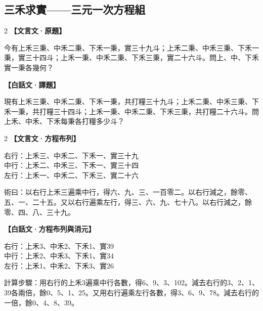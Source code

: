 \documentclass[11pt,a4paper]{article}
\newcommand{\zhc}{}[1]{{\CJKfamily{\CJKrmdefault}#1}}  %
\newcommand{\zhm}[1]{{\CJKfamily{\CJKrmdefault}#1}}  %
\newenvironment{prob bilingual}[1][]{%
  \begin{paracol}{2}%
  \setlength{\columnseprule}{0.4pt}%
}{%
  \end{paracol}%
  \medskip%
}
\begin{document}
\vspace{0.5cm}

\subsection{\zhc{三禾求實——三元一次方程組}}

\begin{paracol}{2}
\switchcolumn[0]
\noindent\textbf{\textcolor{notecolor}{\zhc{【文言文·原題】}}}\par\smallskip
\zhc{
今有上禾三秉、中禾二秉、下禾一秉，實三十九斗；上禾二秉、中禾三秉、下禾一秉，實三十四斗；上禾一秉、中禾二秉、下禾三秉，實二十六斗。問上、中、下禾實一秉各幾何？
}

\switchcolumn[1]
\noindent\textbf{\textcolor{notecolor}{\zhm{【白話文·譯題】}}}\par\smallskip
\zhm{
現有上禾三秉、中禾二秉、下禾一秉，共打糧三十九斗；上禾二秉、中禾三秉、下禾一秉，共打糧三十四斗；上禾一秉、中禾二秉、下禾三秉，共打糧二十六斗。問上禾、中禾、下禾每秉各打糧多少斗？
}
\end{paracol}

\medskip

\begin{paracol}{2}
\switchcolumn[0]
\noindent\textbf{\textcolor{notecolor}{\zhc{【文言文·方程布列】}}}\par\smallskip
\zhc{
右行：上禾三、中禾二、下禾一、實三十九\\
中行：上禾二、中禾三、下禾一、實三十四\\
左行：上禾一、中禾二、下禾三、實二十六

術曰：以右行上禾三遍乘中行，得六、九、三、一百零二。以右行減之，餘零、五、一、二十五。又以右行遍乘左行，得三、六、九、七十八。以右行減之，餘零、四、八、三十九。
}

\switchcolumn[1]
\noindent\textbf{\textcolor{notecolor}{\zhm{【白話文·方程布列與消元】}}}\par\smallskip
\zhm{
右行：上禾3、中禾2、下禾1、實39\\
中行：上禾2、中禾3、下禾1、實34\\
左行：上禾1、中禾2、下禾3、實26

計算步驟：用右行的上禾3遍乘中行各數，得6、9、3、102。減去右行的3、2、1、39各兩倍，餘0、5、1、25。又用右行遍乘左行各數，得3、6、9、78。減去右行的一倍，餘0、4、8、39。
}
\end{paracol}

\medskip
\end{document}
